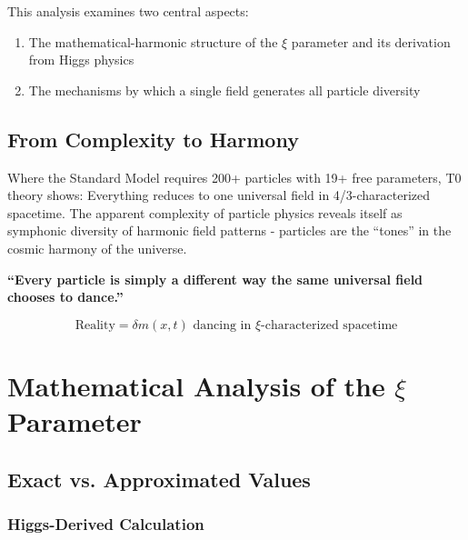 \documentclass[12pt,a4paper]{article}
\newcommand{\xipar}{\ensuremath{\xi}}
\newcommand{\deltafield}{\ensuremath{\delta m}}
\begin{document}
			This analysis examines two central aspects:
			\begin{enumerate}
				\item The mathematical-harmonic structure of the $\xi$ parameter and its derivation from Higgs physics
				\item The mechanisms by which a single field generates all particle diversity
			\end{enumerate}
			
			\subsection{From Complexity to Harmony}
			\label{subsec:from-complexity-to-harmony}
			
			Where the Standard Model requires 200+ particles with 19+ free parameters, T0 theory shows: Everything reduces to one universal field in 4/3-characterized spacetime. The apparent complexity of particle physics reveals itself as symphonic diversity of harmonic field patterns - particles are the ``tones'' in the cosmic harmony of the universe.
			
			\begin{tcolorbox}[colback=blue!5!white,colframe=blue!75!black,title=Central T0 Principle]
				\textbf{``Every particle is simply a different way the same universal field chooses to dance.''}
				
				\begin{equation}
					\boxed{\text{Reality} = \deltafield(x,t) \text{ dancing in } \xipar \text{-characterized spacetime}}
					\label{eq:fundamental_reality}
				\end{equation}
			\end{tcolorbox}
			
			\section{Mathematical Analysis of the $\xi$ Parameter}
			\label{sec:xi_analysis}
			
			\subsection{Exact vs. Approximated Values}
			\label{subsec:exact_vs_approximated}
			
			\subsubsection{Higgs-Derived Calculation}
			\label{subsubsec:higgs_calculation}
			
\end{document}
